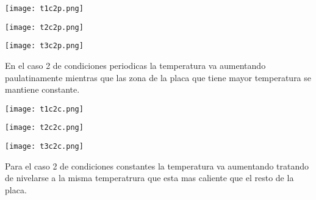 \documentclass{article}
\begin{document}
\begin{center}
\texttt{[image: t1c2p.png]}
\end{center}
\begin{center}
\texttt{[image: t2c2p.png]}
\end{center}
\begin{center}
\texttt{[image: t3c2p.png]}
\end{center}
En el caso 2 de condiciones periodicas la temperatura va aumentando paulatinamente mientras que las zona de la placa que tiene mayor temperatura se mantiene constante.
\\

\begin{center}
\texttt{[image: t1c2c.png]}
\end{center}
\begin{center}
\texttt{[image: t2c2c.png]}
\end{center}
\begin{center}
\texttt{[image: t3c2c.png]}
\end{center}
Para el caso 2 de condiciones constantes la temperatura va aumentando tratando de nivelarse a la misma temperatrura que esta mas caliente que el resto de la placa.
\\
\end{document}
